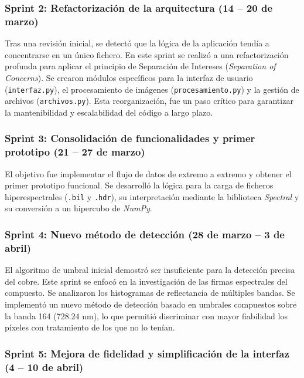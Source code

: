 \subsubsection{Sprint 2: Refactorización de la arquitectura (14 – 20 de marzo)}

Tras una revisión inicial, se detectó que la lógica de la aplicación tendía a concentrarse en un único fichero. En este sprint se realizó a una refactorización profunda para aplicar el principio de Separación de Intereses (\textit{Separation of Concerns}). Se crearon módulos específicos para la interfaz de usuario (\verb|interfaz.py|), el procesamiento de imágenes (\verb|procesamiento.py|) y la gestión de archivos (\verb|archivos.py|). Esta reorganización, fue un paso crítico para garantizar la mantenibilidad y escalabilidad del código a largo plazo.


\subsubsection{Sprint 3: Consolidación de funcionalidades y primer prototipo (21 – 27 de marzo)}

El objetivo fue implementar el flujo de datos de extremo a extremo y obtener el primer prototipo funcional. Se desarrolló la lógica para la carga de ficheros hiperespectrales (\verb|.bil| y \verb|.hdr|), su interpretación mediante la biblioteca \textit{Spectral} y su conversión a un hipercubo de \textit{NumPy}.

\subsubsection{Sprint 4: Nuevo método de detección (28 de marzo – 3 de abril)}

El algoritmo de umbral inicial demostró ser insuficiente para la detección precisa del cobre. Este sprint se enfocó en la investigación de las firmas espectrales del compuesto. Se analizaron los histogramas de reflectancia de múltiples bandas. Se implementó un nuevo método de detección basado en umbrales compuestos sobre la banda 164 (728.24 nm), lo que permitió discriminar con mayor fiabilidad los píxeles con tratamiento de los que no lo tenían.


\subsubsection{Sprint 5: Mejora de fidelidad y simplificación de la interfaz (4 – 10 de abril)}


